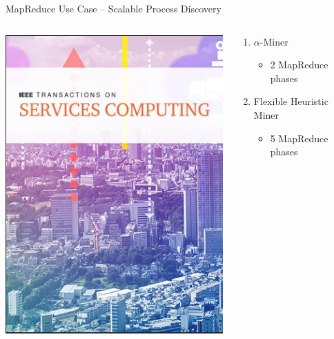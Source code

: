\documentclass[ignorenonframetext,xcolor=x11names]{beamer}
\begin{document}
\begin{frame}{MapReduce Use Case -- Scalable Process Discovery}
\begin{columns}
\begin{column}{.3\textwidth}
\includegraphics[width=\textwidth]{screen1.png}
\end{column}
\begin{column}{.7\textwidth}
\begin{enumerate}
 \item $\alpha$-Miner
 \begin{itemize}
    \item 2 MapReduce phases
 \end{itemize}
 \item Flexible Heuristic Miner
 \begin{itemize}
    \item 5 MapReduce phases
 \end{itemize}
\end{enumerate}

\end{column}
\end{columns}
\end{frame}
\end{document}
